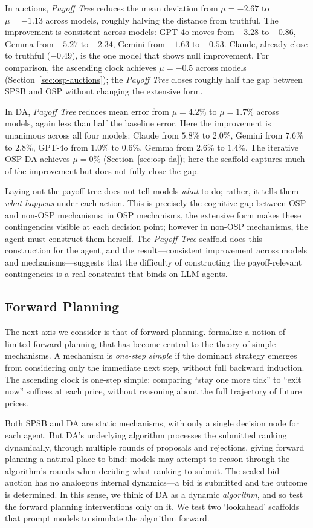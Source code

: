 \documentclass[format=acmsmall, review=false]{acmart}
\begin{document}
In auctions, \textit{Payoff Tree} reduces the mean deviation from $\mu = -2.67$ to $\mu = -1.13$ across models, roughly halving the distance from truthful. The improvement is consistent across models: GPT-4o moves from $-3.28$ to $-0.86$, Gemma from $-5.27$ to $-2.34$, Gemini from $-1.63$ to $-0.53$. Claude, already close to truthful ($-0.49$), is the one model that shows null improvement. For comparison, the ascending clock achieves $\mu = -0.5$ across models (Section~\ref{sec:osp-auctions}); the \textit{Payoff Tree} closes roughly half the gap between SPSB and OSP without changing the extensive form.

In DA, \textit{Payoff Tree} reduces mean error from $\mu = 4.2\%$ to $\mu = 1.7\%$ across models, again less than half the baseline error. Here the improvement is unanimous across all four models: Claude from $5.8\%$ to $2.0\%$, Gemini from $7.6\%$ to $2.8\%$, GPT-4o from $1.0\%$ to $0.6\%$, Gemma from $2.6\%$ to $1.4\%$. The iterative OSP DA achieves $\mu = 0\%$ (Section~\ref{sec:osp-da}); here the scaffold captures much of the improvement but does not fully close the gap.

Laying out the payoff tree does not tell models \textit{what} to do; rather, it tells them \textit{what happens} under each action. This is precisely the cognitive gap between OSP and non-OSP mechanisms: in OSP mechanisms, the extensive form makes these contingencies visible at each decision point; however in non-OSP mechanisms, the agent must construct them herself. The \textit{Payoff Tree} scaffold does this construction for the agent, and the result---consistent improvement across models and mechanisms---suggests that the difficulty of constructing the payoff-relevant contingencies is a real constraint that binds on LLM agents.

\subsection{Forward Planning}
The next axis we consider is that of forward planning. \citet{pycia2023theory} formalize a notion of limited forward planning that has become central to the theory of simple mechanisms. A mechanism is \emph{one-step simple} if the dominant strategy emerges from considering only the immediate next step, without full backward induction. The ascending clock is one-step simple: comparing ``stay one more tick'' to ``exit now'' suffices at each price, without reasoning about the full trajectory of future prices. 

Both SPSB and DA are static mechanisms, with only a single decision node for each agent. But DA's underlying algorithm processes the submitted ranking dynamically, through multiple rounds of proposals and rejections, giving forward planning a natural place to bind: models may attempt to reason through the algorithm's rounds when deciding what ranking to submit. The sealed-bid auction has no analogous internal dynamics---a bid is submitted and the outcome is determined. In this sense, we think of DA as a dynamic \textit{algorithm}, and so test the forward planning interventions only on it. We test two `lookahead' scaffolds that prompt models to simulate the algorithm forward.
\end{document}
